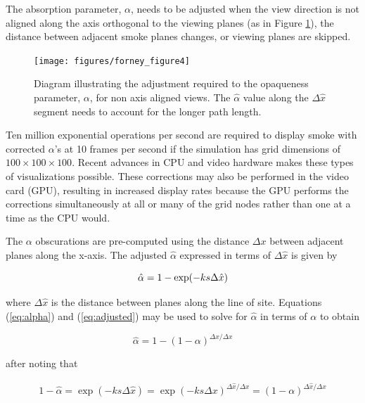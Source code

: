 The absorption parameter, $\alpha$, needs to be adjusted when the view direction is not aligned along the axis orthogonal to the viewing planes (as in Figure \ref{figray}), the distance between adjacent smoke planes changes, or viewing planes are skipped.

\begin{figure}[\figoptions]
\centerline{\texttt{[image: figures/forney\_figure4]}}
\caption [Diagram illustrating the adjustment required to the opaqueness parameter, $\alpha$,
for non-axis aligned views.] { Diagram
illustrating the adjustment required to the opaqueness parameter, $\alpha$,
for non axis aligned views. The $\hat{\alpha}$ value along the $\Delta\hat{x}$ segment needs to account for
the longer path length. } \label{figray}
\end{figure}

Ten million exponential operations per second are required to display smoke with corrected $\alpha$'s at 10 frames per second if the simulation has grid dimensions of $100\times 100\times 100$. Recent advances in CPU and video hardware makes these types of visualizations possible. These corrections may also be performed in the video card (GPU), resulting in increased display rates because the GPU performs the corrections simultaneously at all or many of the grid nodes rather than one at a time as the CPU would.

The $\alpha$ obscurations are pre-computed using the distance $\Delta x$ between adjacent planes along the x-axis. The adjusted $\hat{\alpha}$ expressed in terms of $\Delta\hat{x}$ is given by

\begin{equation}
\label{eq:adjusted}
\hat{\alpha}=1-\exp(-ks\Delta \hat{x})\\
\end{equation}

where $\Delta\hat{x}$ is the distance between planes along the line of site.  Equations (\ref{eq:alpha}) and (\ref{eq:adjusted}) may be used to solve for $\hat{\alpha}$ in terms of $\alpha$ to obtain

\begin{equation}
\label{eq:alphahat}
\hat{\alpha}=1-(1-\alpha)^{\Delta\hat{x}/\Delta x}
\end{equation}

after noting that

\begin{eqnarray*}
1-\hat{\alpha}=\exp(-ks\Delta\hat{x})=\exp(-ks\Delta
x)^{\Delta\hat{x}/\Delta x}=(1-\alpha)^{\Delta\hat{x}/\Delta x}
\end{eqnarray*}

